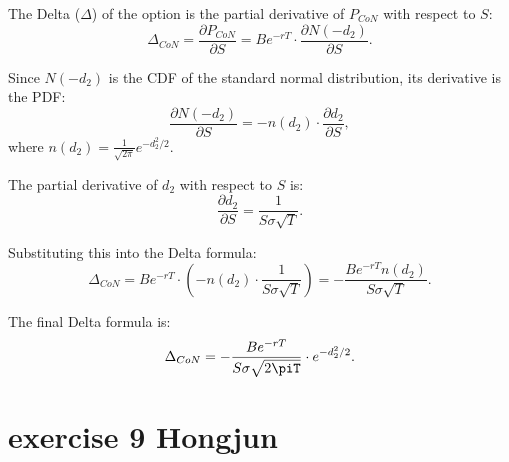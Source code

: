 \documentclass{article}
\begin{document}
The Delta ($\Delta$) of the option is the partial derivative of $P_{CoN}$ with respect to $S$:
\[
\Delta_{CoN} = \frac{\partial P_{CoN}}{\partial S} = B e^{-rT} \cdot \frac{\partial N(-d_2)}{\partial S}.
\]

Since $N(-d_2)$ is the CDF of the standard normal distribution, its derivative is the PDF:
\[
\frac{\partial N(-d_2)}{\partial S} = -n(d_2) \cdot \frac{\partial d_2}{\partial S},
\]
where $n(d_2) = \frac{1}{\sqrt{2\pi}} e^{-d_2^2/2}$.

The partial derivative of $d_2$ with respect to $S$ is:
\[
\frac{\partial d_2}{\partial S} = \frac{1}{S \sigma \sqrt{T}}.
\]

Substituting this into the Delta formula:
\[
\Delta_{CoN} = B e^{-rT} \cdot \left( -n(d_2) \cdot \frac{1}{S \sigma \sqrt{T}} \right) = -\frac{B e^{-rT} n(d_2)}{S \sigma \sqrt{T}}.
\]

The final Delta formula is:
\[
\Delta_{CoN} = -\frac{B e^{-rT}}{S \sigma \sqrt{2\piT}} \cdot e^{-d_2^2/2}.
\]


\section{exercise 9 Hongjun}
\end{document}
